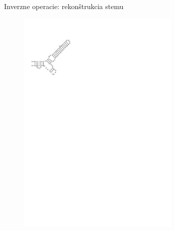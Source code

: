 \begin{figure}[H]
\begin{subfigure}{0.3\textwidth}
  \end{subfigure}
  \caption{Inverzne operacie: rekonštrukcia stemu}
  \label{obr:delete_insert_multibranch}
\end{figure}


\begin{figure}[H]
  \begin{subfigure}{0.3\textwidth}
    \includegraphics[clip, trim=1cm 21cm 14cm 2.5cm, width=0.85\textwidth]{../img/alg/insert/3/multibranch-beg}
  \end{subfigure}
  \begin{subfigure}{0.3\textwidth}

\end{subfigure}
\end{figure}
